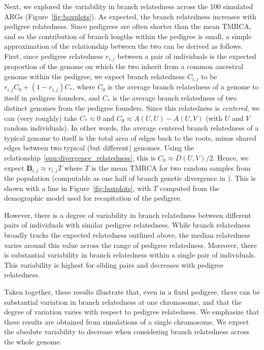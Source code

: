 Next, we explored the variability in branch relatedness across the 100 simulated ARGs
(Figure~\ref{fig:boxplots}).
%
As expected, the branch relatedness increases with pedigree relatedness.
%
Since pedigrees are often shorter than the mean TMRCA,
and so the contribution of branch lengths within the pedigree is small,
a simple approximation of the relationship between the two
can be derived as follows.
%
First, since pedigree relatedness $r_{i,j}$ between a pair of individuals
is the expected proportion of the genome on which the two inherit from
a common ancestral genome within the pedigree,
we expect branch relatedness $C_{i,j}$ to be $r_{i,j} C_0 + (1 - r_{i,j}) C_*$,
where $C_0$ is the average branch relatedness of a genome to itself in pedigree founders,
and $C_*$ is the average branch relatedness of two distinct genomes from the pedigree founders.
%
Since this relatedness is \emph{centered}, we can (very roughly) take
$C_* \approx 0$ and $C_0 \approx A(U,U) - A(U,V)$ (with $U$ and $V$ random individuals).
%
In other words, the average centered branch relatedness
of a typical genome to itself is the total area of edges back to the roots,
minus shared edges between two typical (but different) genomes.
%
Using the relationship~\eqref{eqn:divergence_relatedness},
this is $C_0 \approx D(U,V)/2$.
%
Hence, we expect $\mathbf{B}_{i,j} \approx r_{i,j} T$
where $T$ is the mean TMRCA for two random samples from the population
(computable as one half of branch genetic divergence in \tskit{}).
%
This is shown with a line in Figure~\ref{fig:boxplots},
with $T$ computed from the demographic model used for recapitation of the pedigree.

However, there is a degree of variability in branch relatedness
between different pairs of individuals with similar pedigree relatedness.
%
While branch relatedness broadly tracks the expected relatedness outlined above,
the median relatedness varies around this value across the range of pedigree relatedness.
%
Moreover, there is substantial variability in branch relatedness within a single pair of individuals.
%
This variability is highest for sibling pairs and decreases with pedigree relatedness.

Taken together, these results illustrate that, even in a fixed pedigree,
there can be substantial variation in branch relatedness at one chromosome,
and that the degree of variation varies with respect to pedigree relatedness.
%
We emphasize that these results are obtained from simulations of a single chromosome.
%
We expect the absolute variability to decrease when considering
branch relatedness across the whole genome.

